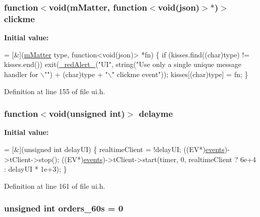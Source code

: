 \subsubsection[{\texorpdfstring{clickme}{clickme}}]{\setlength{\rightskip}{0pt plus 5cm}function$<$void({\bf m\+Matter}, function$<$void(json)$>$$\ast$)$>$ clickme}\hypertarget{class_k_1_1_u_i_ad892fbcdba0fed791f3afcf1bdd0e8c7}{}\label{class_k_1_1_u_i_ad892fbcdba0fed791f3afcf1bdd0e8c7}
{\bfseries Initial value\+:}
\begin{DoxyCode}
= [&](\hyperlink{namespace_k_a06e0333f0bcd3fc79835735bb9cda73d}{mMatter} type, function<void(json)> *fn) \{
        \textcolor{keywordflow}{if} (kisses.find((\textcolor{keywordtype}{char})type) != kisses.end())
          exit(\hyperlink{sh_8h_a7a276367773516f9f6e660c3f4635beb}{\_redAlert\_}(\textcolor{stringliteral}{"UI"}, \textcolor{keywordtype}{string}(\textcolor{stringliteral}{"Use only a single unique message handler for \(\backslash\)""})
            + (\textcolor{keywordtype}{char})type + \textcolor{stringliteral}{"\(\backslash\)" clickme event"}));
        kisses[(char)type] = fn;
      \}
\end{DoxyCode}


Definition at line 155 of file ui.\+h.

\subsubsection[{\texorpdfstring{delayme}{delayme}}]{\setlength{\rightskip}{0pt plus 5cm}function$<$void(unsigned int)$>$ delayme}\hypertarget{class_k_1_1_u_i_aa83b4957f3c3b6166c641811adc7ebff}{}\label{class_k_1_1_u_i_aa83b4957f3c3b6166c641811adc7ebff}
{\bfseries Initial value\+:}
\begin{DoxyCode}
= [&](\textcolor{keywordtype}{unsigned} \textcolor{keywordtype}{int} delayUI) \{
        realtimeClient = !delayUI;
        ((EV*)\hyperlink{class_k_1_1_klass_aef02c650240e6291d8a616cda222d890}{events})->tClient->stop();
        ((EV*)\hyperlink{class_k_1_1_klass_aef02c650240e6291d8a616cda222d890}{events})->tClient->start(timer, 0, realtimeClient ? 6e+4 : delayUI * 1e+3);
      \}
\end{DoxyCode}


Definition at line 161 of file ui.\+h.

\subsubsection[{\texorpdfstring{orders\+\_\+60s}{orders_60s}}]{\setlength{\rightskip}{0pt plus 5cm}unsigned int orders\+\_\+60s = 0}\hypertarget{class_k_1_1_u_i_a44abb2b500cfc21ada184903fb08f22d}{}\label{class_k_1_1_u_i_a44abb2b500cfc21ada184903fb08f22d}


